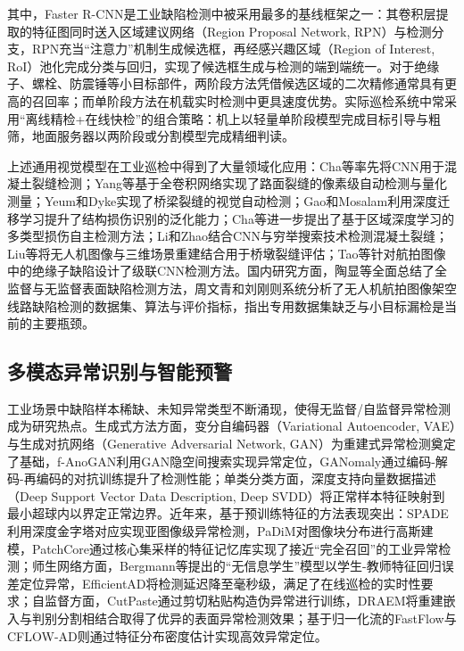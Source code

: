 其中，Faster R-CNN\cite{ren2015faster}是工业缺陷检测中被采用最多的基线框架之一：其卷积层提取的特征图同时送入区域建议网络（Region Proposal Network, RPN）与检测分支，RPN充当“注意力”机制生成候选框，再经感兴趣区域（Region of Interest, RoI）池化完成分类与回归，实现了候选框生成与检测的端到端统一。对于绝缘子、螺栓、防震锤等小目标部件，两阶段方法凭借候选区域的二次精修通常具有更高的召回率；而单阶段方法在机载实时检测中更具速度优势。实际巡检系统中常采用“离线精检+在线快检”的组合策略：机上以轻量单阶段模型完成目标引导与粗筛，地面服务器以两阶段或分割模型完成精细判读\cite{zhouwq2024review,tao2020detection}。

上述通用视觉模型在工业巡检中得到了大量领域化应用：Cha等\cite{cha2017deep}率先将CNN用于混凝土裂缝检测；Yang等\cite{yang2018pixel}基于全卷积网络实现了路面裂缝的像素级自动检测与量化测量；Yeum和Dyke\cite{yeum2015vision}实现了桥梁裂缝的视觉自动检测；Gao和Mosalam\cite{gao2018deep}利用深度迁移学习提升了结构损伤识别的泛化能力；Cha等\cite{cha2018autonomous}进一步提出了基于区域深度学习的多类型损伤自主检测方法；Li和Zhao\cite{li2019image}结合CNN与穷举搜索技术检测混凝土裂缝；Liu等\cite{liu2020image}将无人机图像与三维场景重建结合用于桥墩裂缝评估；Tao等\cite{tao2020detection}针对航拍图像中的绝缘子缺陷设计了级联CNN检测方法。国内研究方面，陶显等\cite{taox2021survey}全面总结了全监督与无监督表面缺陷检测方法，周文青和刘刚\cite{zhouwq2024review}则系统分析了无人机航拍图像架空线路缺陷检测的数据集、算法与评价指标，指出专用数据集缺乏与小目标漏检是当前的主要瓶颈。

\subsection{多模态异常识别与智能预警}

工业场景中缺陷样本稀缺、未知异常类型不断涌现，使得无监督/自监督异常检测成为研究热点。生成式方法方面，变分自编码器（Variational Autoencoder, VAE）\cite{kingma2014auto}与生成对抗网络（Generative Adversarial Network, GAN）\cite{goodfellow2014generative}为重建式异常检测奠定了基础，f-AnoGAN\cite{fangan2019}利用GAN隐空间搜索实现异常定位，GANomaly通过编码-解码-再编码的对抗训练提升了检测性能；单类分类方面，深度支持向量数据描述（Deep Support Vector Data Description, Deep SVDD）\cite{ruff2018deep}将正常样本特征映射到最小超球内以界定正常边界。近年来，基于预训练特征的方法表现突出：SPADE利用深度金字塔对应实现亚图像级异常检测，PaDiM对图像块分布进行高斯建模，PatchCore\cite{roth2022towards}通过核心集采样的特征记忆库实现了接近“完全召回”的工业异常检测；师生网络方面，Bergmann等提出的“无信息学生”模型以学生-教师特征回归误差定位异常，EfficientAD\cite{batzner2024efficientad}将检测延迟降至毫秒级，满足了在线巡检的实时性要求；自监督方面，CutPaste通过剪切粘贴构造伪异常进行训练，DRAEM\cite{zavrtanik2021draem}将重建嵌入与判别分割相结合取得了优异的表面异常检测效果；基于归一化流的FastFlow与CFLOW-AD则通过特征分布密度估计实现高效异常定位。



